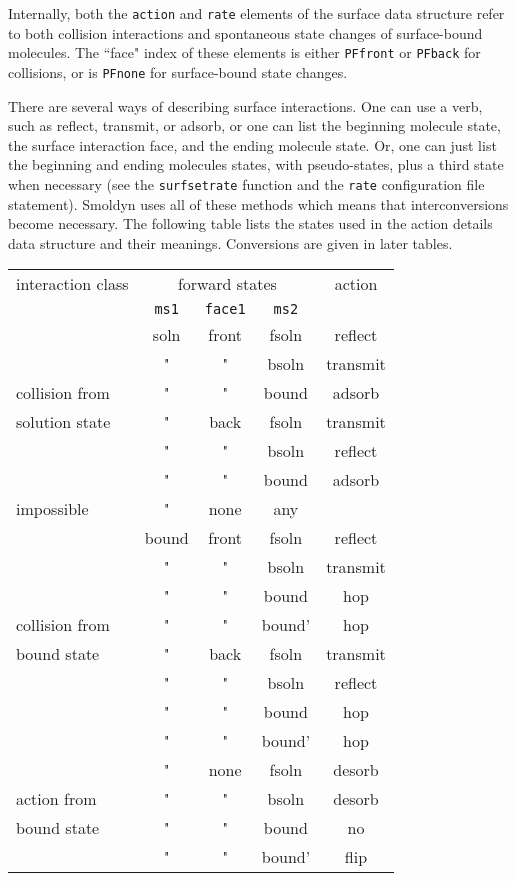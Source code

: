 \documentclass {book}
\newcommand {\ttt} {\texttt}
\begin{document}
Internally, both the \ttt{action} and \ttt{rate} elements of the surface data structure refer to both collision interactions and spontaneous state changes of surface-bound molecules. The ``face" index of these elements is either \ttt{PFfront} or \ttt{PFback} for collisions, or is \ttt{PFnone} for surface-bound state changes.

There are several ways of describing surface interactions. One can use a verb, such as reflect, transmit, or adsorb, or one can list the beginning molecule state, the surface interaction face, and the ending molecule state. Or, one can just list the beginning and ending molecules states, with pseudo-states, plus a third state when necessary (see the \ttt{surfsetrate} function and the \ttt{rate} configuration file statement). Smoldyn uses all of these methods which means that interconversions become necessary. The following table lists the states used in the action details data structure and their meanings. Conversions are given in later tables.

\begin{longtable}[c]{l|ccc|c}
interaction class&\multicolumn{3}{c}{forward states}&action\\
&\ttt{ms1}&\ttt{face1}&\ttt{ms2}\\
\hline
&soln&front&fsoln&reflect\\
&"&"&bsoln&transmit\\
collision from&"&"&bound&adsorb\\
solution state&"&back&fsoln&transmit\\
&"&"&bsoln&reflect\\
&"&"&bound&adsorb\\
\hline
impossible&"&none&any\\
\hline
&bound&front&fsoln&reflect\\
&"&"&bsoln&transmit\\
&"&"&bound&hop\\
collision from&"&"&bound'&hop\\
bound state&"&back&fsoln&transmit\\
&"&"&bsoln&reflect\\
&"&"&bound&hop\\
&"&"&bound'&hop\\
\hline
&"&none&fsoln&desorb\\
action from&"&"&bsoln&desorb\\
bound state&"&"&bound&no\\
&"&"&bound'&flip\\
\end{longtable}
\end{document}
